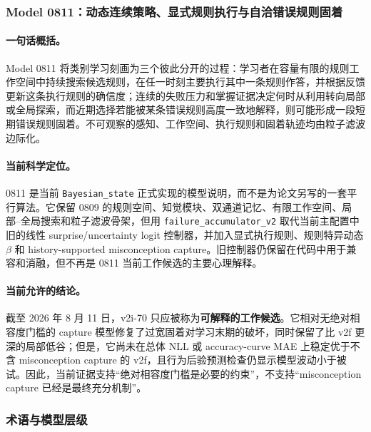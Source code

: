 
\subsubsection{Model 0811：动态连续策略、显式规则执行与自洽错误规则固着}

\paragraph{一句话概括。}
Model 0811 将类别学习刻画为三个彼此分开的过程：学习者在容量有限的规则工作空间中持续搜索候选规则，在任一时刻主要执行其中一条规则作答，并根据反馈更新这条执行规则的确信度；连续的失败压力和掌握证据决定何时从利用转向局部或全局探索，而近期选择若能被某条错误规则高度一致地解释，则可能形成一段短期错误规则固着。不可观察的感知、工作空间、执行规则和固着轨迹均由粒子滤波边际化。

\paragraph{当前科学定位。}
0811 是当前 \texttt{Bayesian\_state} 正式实现的模型说明，而不是为论文另写的一套平行算法。它保留 0809 的规则空间、知觉模块、双通道记忆、有限工作空间、局部--全局搜索和粒子滤波骨架，但用
\texttt{failure\_accumulator\_v2} 取代当前主配置中旧的线性 surprise/uncertainty logit 控制器，并加入显式执行规则、规则特异动态 $\beta$ 和 history-supported misconception capture。旧控制器仍保留在代码中用于兼容和消融，但不再是 0811 当前工作候选的主要心理解释。

\paragraph{当前允许的结论。}
截至 2026 年 8 月 11 日，v2i-70 只应被称为\textbf{可解释的工作候选}。它相对无绝对相容度门槛的 capture 模型修复了过宽固着对学习末期的破坏，同时保留了比 v2f 更深的局部低谷；但是，它尚未在总体 NLL 或 accuracy-curve MAE 上稳定优于不含 misconception capture 的 v2f，且行为后验预测检查仍显示模型波动小于被试。因此，当前证据支持“绝对相容度门槛是必要的约束”，不支持“misconception capture 已经是最终充分机制”。


\subsubsection{术语与模型层级}

